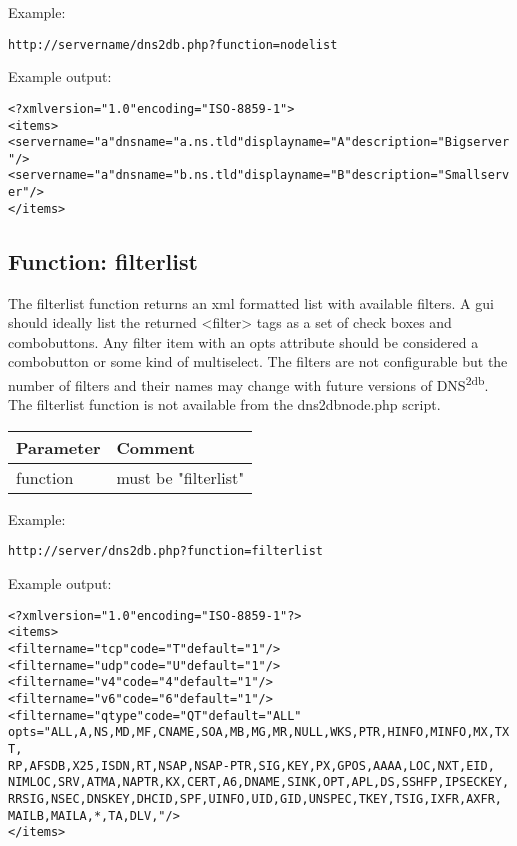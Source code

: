 \documentclass[a4paper]{article}
\newcommand{\urlb}{\footnotesize\begin{alltt}}
\newcommand{\urle}{\end{alltt}\normalsize}
\newcommand{\exampleb}{\small\begin{alltt}}
\newcommand{\examplee}{\end{alltt}\normalsize}
\newcommand{\xml}[1]{\textless#1\textgreater}
\newcommand{\dnsdb}{DNS\textsuperscript{2db}}
\begin{document}
Example:

\urlb
http://servername/dns2db.php?function=nodelist
\urle

Example output:
\exampleb
<?xml version="1.0" encoding="ISO-8859-1">
<items>
 <server name="a" dnsname="a.ns.tld" displayname="A" description="Big server"/>
 <server name="a" dnsname="b.ns.tld" displayname="B" description="Small server"/>
</items>
\examplee
     
     
\newpage
\subsection{Function: filterlist}

	The filterlist function returns an xml formatted list with available filters.
	A gui should ideally list the returned \xml{filter} tags as a set of check boxes and combobuttons. 		
	Any filter item with an opts attribute should be considered a combobutton or some kind of multiselect.
	The filters are not configurable but the number of filters and their names may change with future versions of \dnsdb.\\
	The filterlist function is not available from the dns2dbnode.php script.

\begin{center}
    \begin{tabular}{ | l | p{6cm}|}
    \hline
    \textbf{Parameter} & \textbf{Comment}  
    \\ \hline
    function
    &
    must be "filterlist"
    \\ \hline

    \end{tabular}
\end{center}

Example:

\urlb
http://server/dns2db.php?function=filterlist
\urle

Example output:

\exampleb
<?xml version="1.0" encoding="ISO-8859-1"?> 
<items> 
  <filter name="tcp" code="T" default="1"/> 
  <filter name="udp" code="U" default="1"/> 
  <filter name="v4" code="4" default="1"/> 
  <filter name="v6" code="6" default="1"/> 
  <filter name="qtype" code="QT" default="ALL"
      opts="ALL,A,NS,MD,MF,CNAME,SOA,MB,MG,MR,NULL,WKS,PTR,HINFO,MINFO,MX,TXT,
          RP,AFSDB,X25,ISDN,RT,NSAP,NSAP-PTR,SIG,KEY,PX,GPOS,AAAA,LOC,NXT,EID,
          NIMLOC,SRV,ATMA,NAPTR,KX,CERT,A6,DNAME,SINK,OPT,APL,DS,SSHFP,IPSECKEY,
          RRSIG,NSEC,DNSKEY,DHCID,SPF,UINFO,UID,GID,UNSPEC,TKEY,TSIG,IXFR,AXFR,
          MAILB,MAILA,*,TA,DLV,"/> 
</items> 
\examplee
\newpage
\end{document}
